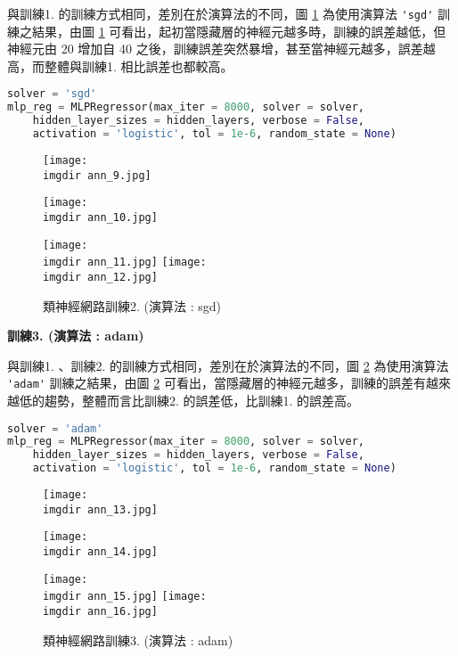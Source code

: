 與訓練1. 的訓練方式相同，差別在於演算法的不同，圖 \ref{fig:ann_6} 為使用演算法 \verb|'sgd'| 訓練之結果，由圖 \ref{fig:ann_6} 可看出，起初當隱藏層的神經元越多時，訓練的誤差越低，但神經元由 20 增加自 40 之後，訓練誤差突然暴增，甚至當神經元越多，誤差越高，而整體與訓練1. 相比誤差也都較高。
\bigskip
\begin{lstlisting}[language = Python]
solver = 'sgd' 
mlp_reg = MLPRegressor(max_iter = 8000, solver = solver,
    hidden_layer_sizes = hidden_layers, verbose = False,
    activation = 'logistic', tol = 1e-6, random_state = None)
\end{lstlisting}
\begin{figure}[htbp]
\centering
\begin{minipage}[t]{0.48\textwidth}
\centering
\centerline{\texttt{[image: \\imgdir ann\_9.jpg]}}
\caption*{}
\end{minipage}
\begin{minipage}[t]{0.48\textwidth}
\centering
\centerline{\texttt{[image: \\imgdir ann\_10.jpg]}}
\caption*{}
\end{minipage}
\end{figure}
\begin{figure}[H]
	\centering
	\texttt{[image: \\imgdir ann\_11.jpg]}
	\texttt{[image: \\imgdir ann\_12.jpg]}
	\caption{類神經網路訓練2. (演算法 : sgd)}
	 \label{fig:ann_6}
\end{figure}

\textbf{\large 訓練3. (演算法 : adam)} 

與訓練1. 、訓練2. 的訓練方式相同，差別在於演算法的不同，圖 \ref{fig:ann_7} 為使用演算法 \verb|'adam'| 訓練之結果，由圖 \ref{fig:ann_7} 可看出，當隱藏層的神經元越多，訓練的誤差有越來越低的趨勢，整體而言比訓練2. 的誤差低，比訓練1. 的誤差高。
\bigskip
\begin{lstlisting}[language = Python]
solver = 'adam' 
mlp_reg = MLPRegressor(max_iter = 8000, solver = solver,
    hidden_layer_sizes = hidden_layers, verbose = False,
    activation = 'logistic', tol = 1e-6, random_state = None)
\end{lstlisting}
\begin{figure}[htbp]
\centering
\begin{minipage}[t]{0.48\textwidth}
\centering
\centerline{\texttt{[image: \\imgdir ann\_13.jpg]}}
\caption*{}
\end{minipage}
\begin{minipage}[t]{0.48\textwidth}
\centering
\centerline{\texttt{[image: \\imgdir ann\_14.jpg]}}
\caption*{}
\end{minipage}
\end{figure}
\begin{figure}[H]
	\centering
	\texttt{[image: \\imgdir ann\_15.jpg]}
	\texttt{[image: \\imgdir ann\_16.jpg]}
	\caption{類神經網路訓練3. (演算法 : adam)}
	 \label{fig:ann_7}
\end{figure}

